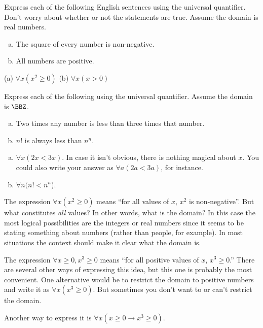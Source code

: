 \begin{exa}
Express each of the following English sentences using the universal quantifier.
Don't worry about whether or not the statements are true.
Assume the domain is real numbers.
\begin{enumerate}[(a)]
\item
The square of every number is non-negative.
\item
All numbers are positive.
\end{enumerate}
\begin{sol}
(a) $\forall x (x^2\geq 0)$ \hspace*{.5in}
(b) $\forall x (x >0)$
\end{sol}
\end{exa}

\begin{exer}
Express each of the following using the universal quantifier.
Assume the domain is $\BBZ$.
\begin{enumerate}[(a)]
\item
Two times any number is less than three times that number.\\
\answerline
\item
$n!$ is always less than $n^n$.\\
\answerline
\end{enumerate}
\begin{answer}
\begin{enumerate}[(a)]
\item $\forall x (2x<3x)$.  In case it isn't obvious, there is nothing magical about $x$.  
You could also write your answer as $\forall a (2a<3a)$, for instance.
\item $\forall n (n!<n^n$).
\end{enumerate}
\end{answer}
\end{exer}

\begin{exa}
The expression  $\forall x(x^2\geq 0)$ means ``for all values of $x$, $x^2$ is non-negative''. 
But what constitutes {\em all} values?  In other words, what is the domain?
In this case the most logical possibilities are the integers or real numbers since it seems
to be stating something about numbers (rather than people, for example).
In most situations the context should make it clear what the domain is. 
\end{exa}

\begin{exa}
The expression $\forall x\geq 0, x^3\geq 0$ means ``for all positive values of $x$, $x^3\geq 0$.''
There are several other ways of expressing this idea, but this one is probably the most convenient.  
One alternative would be to restrict the domain to
positive numbers and write it as $\forall x (x^3\geq 0)$.  But sometimes you don't want to 
or can't restrict the domain.  

Another way  to express it is $\forall x(x\geq 0 \rightarrow x^3\geq 0)$.
\end{exa}

